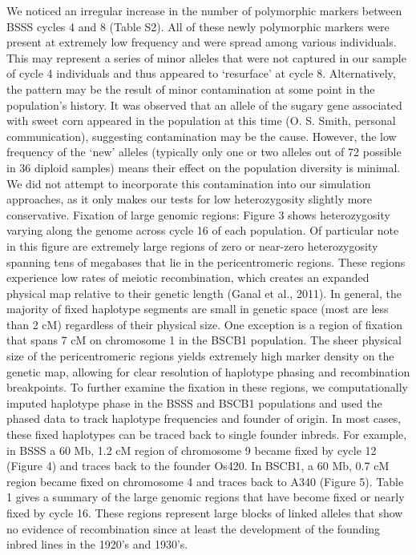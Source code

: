 We noticed an irregular increase in the number of polymorphic markers between BSSS cycles 4 and 8 (Table S2). All of these newly polymorphic markers were present at extremely low frequency and were spread among various individuals. This may represent a series of minor alleles that were not captured in our sample of cycle 4 individuals and thus appeared to ‘resurface’ at cycle 8. Alternatively, the pattern may be the result of minor contamination at some point in the population’s history. It was observed that an allele of the sugary gene associated with sweet corn appeared in the population at this time (O. S. Smith, personal communication), suggesting contamination may be the cause. However, the low frequency of the ‘new’ alleles (typically only one or two alleles out of 72 possible in 36 diploid samples) means their effect on the population diversity is minimal.  We did not attempt to incorporate this contamination into our simulation approaches, as it only makes our tests for low heterozygosity slightly more conservative.
	Fixation of large genomic regions:  Figure 3 shows heterozygosity varying along the genome across cycle 16 of each population. Of particular note in this figure are extremely large regions of zero or near-zero heterozygosity spanning tens of megabases that lie in the pericentromeric regions. These regions experience low rates of meiotic recombination, which creates an expanded physical map relative to their genetic length (Ganal et al., 2011). In general, the majority of fixed haplotype segments are small in genetic space (most are less than 2 cM) regardless of their physical size. One exception is a region of fixation that spans 7 cM on chromosome 1 in the BSCB1 population. 
The sheer physical size of the pericentromeric regions yields extremely high marker density on the genetic map, allowing for clear resolution of haplotype phasing and recombination breakpoints. To further examine the fixation in these regions, we computationally imputed haplotype phase in the BSSS and BSCB1 populations and used the phased data to track haplotype frequencies and founder of origin. In most cases, these fixed haplotypes can be traced back to single founder inbreds. For example, in BSSS a 60 Mb, 1.2 cM region of chromosome 9 became fixed by cycle 12 (Figure 4) and traces back to the founder Os420. In BSCB1, a 60 Mb, 0.7 cM region became fixed on chromosome 4 and traces back to A340 (Figure 5). Table 1 gives a summary of the large genomic regions that have become fixed or nearly fixed by cycle 16. These regions represent large blocks of linked alleles that show no evidence of recombination since at least the development of the founding inbred lines in the 1920’s and 1930’s.
